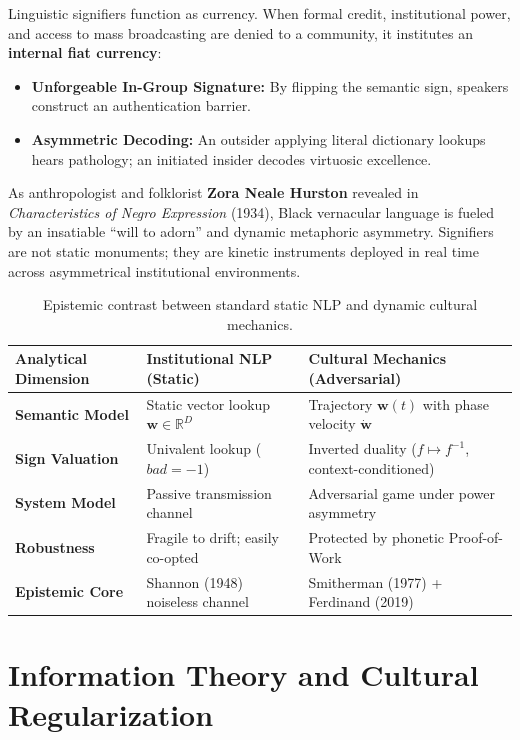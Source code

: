 \documentclass[11pt,letterpaper]{article}
\begin{document}
Linguistic signifiers function as currency. When formal credit, institutional power, and access to mass broadcasting are denied to a community, it institutes an \textbf{internal fiat currency}:
\begin{itemize}[itemsep=2pt, topsep=2pt]
    \item \textbf{Unforgeable In-Group Signature:} By flipping the semantic sign, speakers construct an authentication barrier.
    \item \textbf{Asymmetric Decoding:} An outsider applying literal dictionary lookups hears pathology; an initiated insider decodes virtuosic excellence.
\end{itemize}

As anthropologist and folklorist \textbf{Zora Neale Hurston} revealed in \textit{Characteristics of Negro Expression} (1934), Black vernacular language is fueled by an insatiable ``will to adorn'' and dynamic metaphoric asymmetry. Signifiers are not static monuments; they are kinetic instruments deployed in real time across asymmetrical institutional environments.

\begin{table}[htbp]
\centering
\small
\begin{tabular}{@{}p{3.8cm} p{5.2cm} p{6.5cm}@{}}
\toprule
\textbf{Analytical Dimension} & \textbf{Institutional NLP (Static)} & \textbf{Cultural Mechanics (Adversarial)} \\ \midrule
\textbf{Semantic Model} & Static vector lookup $\mathbf{w} \in \mathbb{R}^D$ & Trajectory $\mathbf{w}(t)$ with phase velocity $\dot{\mathbf{w}}$ \\
\textbf{Sign Valuation} & Univalent lookup ($bad = -1$) & Inverted duality ($f \mapsto f^{-1}$, context-conditioned) \\
\textbf{System Model} & Passive transmission channel & Adversarial game under power asymmetry \\
\textbf{Robustness} & Fragile to drift; easily co-opted & Protected by phonetic Proof-of-Work \\
\textbf{Epistemic Core} & Shannon (1948) noiseless channel & Smitherman (1977) + Ferdinand (2019) \\ \bottomrule
\end{tabular}
\caption{Epistemic contrast between standard static NLP and dynamic cultural mechanics.}
\label{tab:nlp_comparison}
\end{table}

\section{Information Theory and Cultural Regularization}
\end{document}
